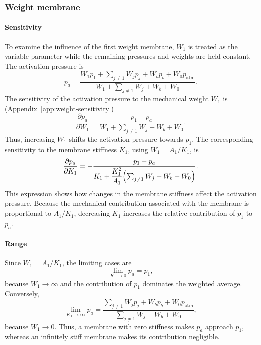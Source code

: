 \documentclass[11pt,a4paper]{article}
\numberwithin{equation}{section}
\newcommand{\patm}{p_{\mathrm{atm}}}
\begin{document}
\subsubsection{Weight membrane}

\paragraph{Sensitivity}

To examine the influence of the first weight membrane, $W_1$ is treated as the variable parameter while the
remaining pressures and weights are held constant. The activation pressure is
\begin{equation}
  p_a = \frac{W_1 p_1 + \sum_{j\neq 1} W_j p_j + W_b p_b + W_0 \patm}{W_1 + \sum_{j\neq 1} W_j + W_b + W_0} .
  \label{eq:pa-w1}
\end{equation}
The sensitivity of the activation pressure to the mechanical weight $W_1$ is (Appendix~\ref{app:weight-sensitivity})
\begin{equation}
  \frac{\partial p_a}{\partial W_1} = \frac{p_1 - p_a}{W_1 + \sum_{j\neq 1} W_j + W_b + W_0} .
  \label{eq:dpa-dw1}
\end{equation}
Thus, increasing $W_1$ shifts the activation pressure towards $p_1$. The corresponding sensitivity to the membrane
stiffness $K_1$, using $W_1 = A_1/K_1$, is
\begin{equation}
  \frac{\partial p_a}{\partial K_1} =
    -\frac{p_1 - p_a}{K_1 + \dfrac{K_1^2}{A_1}\Bigl(\sum_{j\neq 1} W_j + W_b + W_0\Bigr)} .
  \label{eq:dpa-dk1}
\end{equation}
This expression shows how changes in the membrane stiffness affect the activation pressure. Because the mechanical
contribution associated with the membrane is proportional to $A_1/K_1$, decreasing $K_1$ increases the relative
contribution of $p_1$ to $p_a$.

\paragraph{Range}

Since $W_1 = A_1/K_1$, the limiting cases are
\begin{equation}
  \lim_{K_1 \rightarrow 0} p_a = p_1,
  \label{eq:lim-k0}
\end{equation}
because $W_1 \rightarrow \infty$ and the contribution of $p_1$ dominates the weighted average. Conversely,
\begin{equation}
  \lim_{K_1 \rightarrow \infty} p_a =
    \frac{\sum_{j\neq 1} W_j p_j + W_b p_b + W_0 \patm}{\sum_{j\neq 1} W_j + W_b + W_0},
  \label{eq:lim-kinf}
\end{equation}
because $W_1 \rightarrow 0$. Thus, a membrane with zero stiffness makes $p_a$ approach $p_1$, whereas an infinitely
stiff membrane makes its contribution negligible.
\end{document}

